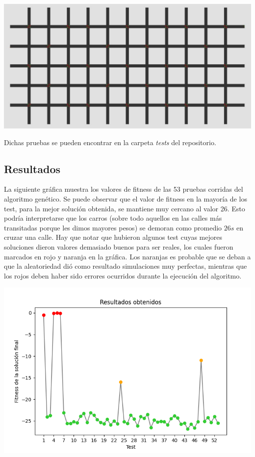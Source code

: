 \documentclass[colorinlistoftodos,twoside,twocolumn]{article} %
\begin{document}
	\begin{center}
		\includegraphics[width=\columnwidth]{map.jpg}
	\end{center}
	
	Dichas pruebas se pueden encontrar en la carpeta \emph{tests} del repositorio. 

	\subsection{Resultados}
	
	La siguiente gr\'afica muestra los valores de fitness de las 53 pruebas corridas del algoritmo gen\'etico. Se puede observar que el valor de fitness en la mayor\'ia de los test, para la mejor soluci\'on obtenida, se mantiene muy cercano al valor 26. Esto podr\'ia interpretarse que los carros (sobre todo aquellos en las calles m\'as transitadas porque les dimos mayores pesos) se demoran como promedio $26s$ en cruzar una calle. Hay que notar que hubieron algunos test cuyas mejores soluciones dieron valores demasiado buenos para ser reales, los cuales fueron marcados en rojo y naranja en la gr\'afica. Los naranjas es probable que se deban a que la aleatoriedad dió como resultado simulaciones muy perfectas, mientras que los rojos deben haber sido errores ocurridos durante la ejecuci\'on del algoritmo.
	
	\begin{center}
		\includegraphics[width=\columnwidth]{graphic_resultados_obtenidos.png}
	\end{center}
\end{document}
